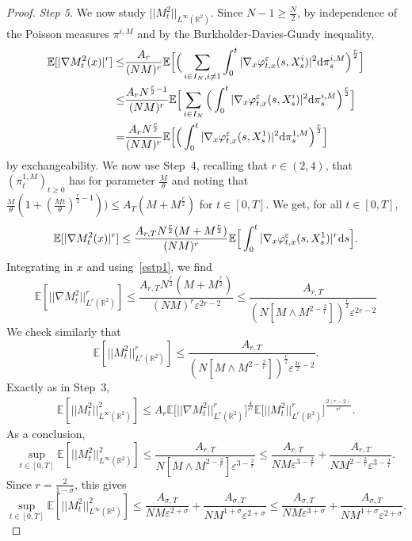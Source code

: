 \documentclass[11pt]{article}
\newcommand{\E}{\mathbb{E}}
\newcommand{\R}{\mathbb{R}}
\newcommand{\1}{\mathbbm{1}}
\newcommand{\dd}{{\rm d}}
\newcommand{\e}{\varepsilon}
\begin{document}
\begin{proof}
{\it Step 5.} We now study $||M^2_t||_{L^\infty(\R^2)}$. Since $N-1\geq \frac N2$, 
by independence of the Poisson measures $\pi^{i,M}$ and
by the Burkholder-Davies-Gundy inequality,
\begin{align*}
\E[|\nabla M^2_t(x)|^r]\leq& \frac{A_r}{(NM)^r} \E\Big[\Big(\sum_{i \in I_N, i\neq 1}\int_0^t
|\nabla_x \varphi^\e_{t,x}(s,X^i_s)|^2 \dd \pi^{i,M}_s \Big)^{\frac r2}\Big]\\
\leq &  \frac{A_r N^{\frac r 2 -1}}{(NM)^r} \E\Big[\sum_{i \in I_N} \Big(\int_0^t
|\nabla_x \varphi^\e_{t,x}(s,X^i_s)|^2 \dd \pi^{i,M}_s \Big)^{\frac r2}\Big]\\
=&  \frac{A_r N^{\frac r 2}}{(NM)^r} \E\Big[\Big(\int_0^t
|\nabla_x \varphi^\e_{t,x}(s,X^1_s)|^2 \dd \pi^{1,M}_s \Big)^{\frac r2}\Big]
\end{align*}
by exchangeability. We now use Step~4, recalling that $r \in (2,4)$, that $(\pi^{1,M}_t)_{t\geq 0}$ has for parameter
$\frac M \theta$ and noting that $\frac M \theta(1+(\frac{Mt}\theta)^{\frac r2-1}))\leq A_T (M+M^{\frac r 2})$
for $t\in [0,T]$.
We get, for all $t\in [0,T]$,
$$
\E[|\nabla M^2_t(x)|^r]\leq \frac{A_{r,T} N^{\frac r 2} (M+M^{\frac r 2})}{(NM)^r} \E\Big[\int_0^t
|\nabla_x \varphi^\e_{t,x}(s,X^1_s)|^r \dd s\Big].
$$
Integrating in $x$ and using~\eqref{estp1}, we find
$$
\E[||\nabla M^2_t||_{L^r(\R^2)}^r] \leq \frac{A_{r,T} N^{\frac r 2}(M+M^{\frac r 2})}{(NM)^{r} \e^{2r-2}}
\leq  \frac{A_{r,T} }{(N[M\land M^{2-\frac2r} ])^{\frac r2} \e^{2r-2}}
$$
We check similarly that 
$$
\E[||M^2_t||_{L^r(\R^2)}^r] \leq \frac{A_{r,T}}{(N[M\land M^{2-\frac2r} ])^{\frac r 2} \e^{\frac {3r}2-2}}.
$$
Exactly as in Step~3, 
\begin{align*}
\E[||M^2_t||_{L^\infty(\R^2)}^2]\leq A_{r} \E\Big[||\nabla M^2_t||_{L^r(\R^2)}^r\Big]^{\frac{4}{r^2}}
\E\Big[||M^2_t||_{L^r(\R^2)}^r\Big]^{\frac{2(r-2)}{r^2}}.
\end{align*}
As a conclusion,
\begin{equation*}
\sup_{t\in [0,T]}\E[||M^2_t||_{L^\infty(\R^2)}^2]\leq \frac{A_{r,T}}{N[M\land M^{2-\frac2r} ]\e^{3-\frac 2 r}}
\leq \frac{A_{r,T}}{NM\e^{3-\frac 2 r}}+ \frac{A_{r,T}}{NM^{2-\frac 2r}\e^{3-\frac 2r}}.
\end{equation*}
Since $r=\frac 2{1-\sigma}$, this gives
\begin{equation*}
\sup_{t\in [0,T]}\E[||M^2_t||_{L^\infty(\R^2)}^2]
\leq \frac{A_{\sigma,T}}{NM\e^{2+\sigma}}+ \frac{A_{\sigma,T}}{NM^{1+\sigma}\e^{2+\sigma}}
\leq \frac{A_{\sigma,T}}{NM\e^{3+\sigma}}+ \frac{A_{\sigma,T}}{NM^{1+\sigma}\e^{2+\sigma}}.
\end{equation*}



\end{proof}
\end{document}
